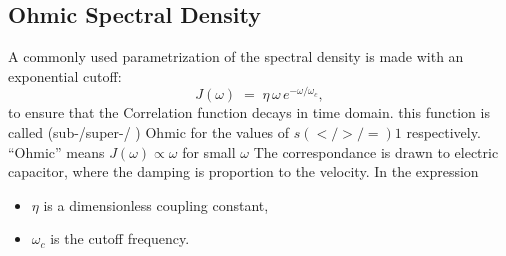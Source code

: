 \subsection{Ohmic Spectral Density}

A commonly used parametrization of the spectral density is made with an exponential cutoff:
\[
J(\omega) \;=\; \eta \,\omega\, e^{-\omega/\omega_c},
\]
to ensure that the Correlation function decays in time domain.
this function is called (sub-/super-/ ) Ohmic for the values of $ s (< / > / =) 1 $ respectively.
``Ohmic'' means $J(\omega) \propto \omega$ for small $\omega$
The correspondance is drawn to electric capacitor, where the damping is proportion to the velocity.
In the expression 
\begin{itemize}
  \item $\eta$ is a dimensionless coupling constant,
  \item $\omega_c$ is the cutoff frequency.
\end{itemize}
